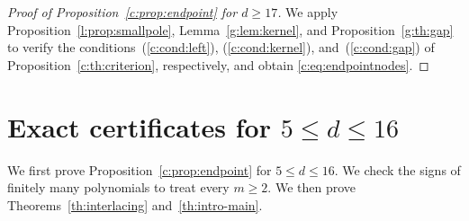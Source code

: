 \documentclass[10pt,a4paper]{article}
\numberwithin{equation}{section}
\theoremstyle{remark}\newtheorem{remark}[theorem]{Remark}
\begin{document}
\begin{proof}[Proof of Proposition~\ref{c:prop:endpoint} for $d\ge17$]
We apply Proposition~\ref{l:prop:smallpole},
Lemma~\ref{g:lem:kernel}, and Proposition~\ref{g:th:gap} to verify the
conditions~(\ref{c:cond:left}), (\ref{c:cond:kernel}), and~(\ref{c:cond:gap})
of Proposition~\ref{c:th:criterion}, respectively, and obtain
\eqref{c:eq:endpointnodes}.
\end{proof}

\section{Exact certificates for \texorpdfstring{$5\le d\le16$}{5 <= d <= 16}}\label{sec:lowranks}
We first prove Proposition~\ref{c:prop:endpoint} for $5\le d\le16$.
We check the signs of finitely many polynomials to treat every $m\ge2$.
We then prove Theorems~\ref{th:interlacing} and~\ref{th:intro-main}.
\end{document}
